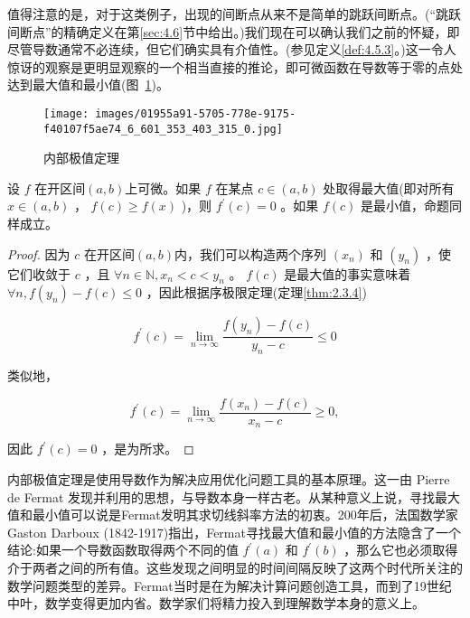 值得注意的是，对于这类例子，出现的间断点从来不是简单的跳跃间断点。(“跳跃间断点”的精确定义在第\ref{sec:4.6}节中给出。)我们现在可以确认我们之前的怀疑，即尽管导数通常不必连续，但它们确实具有介值性。(参见定义\ref{def:4.5.3}。)这一令人惊讶的观察是更明显观察的一个相当直接的推论，即可微函数在导数等于零的点处达到最大值和最小值(图~\ref{fig:5.3})。

\begin{figure}[t]
  \centering
  \texttt{[image: images/01955a91-5705-778e-9175-f40107f5ae74\_6\_601\_353\_403\_315\_0.jpg]}
  \caption{内部极值定理}
  \label{fig:5.3}
\end{figure}


\begin{Thm}
  \label{thm:5.2.6}
  设 \(f\) 在开区间$(a, b)$上可微。如果 \(f\) 在某点 \(c \in  \left( {a,b}\right)\) 处取得最大值(即对所有 \(x \in  \left( {a,b}\right)\) ， \(f\left( c\right)  \geq  f\left( x\right)\) )，则 \({f}^{\prime }\left( c\right)  = 0\) 。如果 \(f\left( c\right)\) 是最小值，命题同样成立。
\end{Thm}

\begin{proof}
  因为 \(c\) 在开区间$(a, b)$内，我们可以构造两个序列 \(\left( {x}_{n}\right)\) 和 \(\left( {y}_{n}\right)\)  ，使它们收敛于 \(c\) ，且 \( \forall n \in  \mathbb{N}, {x}_{n} < c < {y}_{n}\) 。 \(f\left( c\right)\) 是最大值的事实意味着 \(\forall n, f\left( {y}_{n}\right)  - f\left( c\right)  \leq  0\) ，因此根据序极限定理(定理\ref{thm:2.3.4})

\[
{f}^{\prime }\left( c\right)  = \mathop{\lim }\limits_{{n \rightarrow  \infty }}\frac{f\left( {y}_{n}\right)  - f\left( c\right) }{{y}_{n} - c} \leq  0
\]

类似地，

\[
{f}^{\prime }\left( c\right)  = \mathop{\lim }\limits_{{n \rightarrow  \infty }}\frac{f\left( {x}_{n}\right)  - f\left( c\right) }{{x}_{n} - c} \geq  0,
\]

因此 \({f}^{\prime }\left( c\right)  = 0\) ，是为所求。
\end{proof}


内部极值定理是使用导数作为解决应用优化问题工具的基本原理。这一由 Pierre de Fermat 发现并利用的思想，与导数本身一样古老。从某种意义上说，寻找最大值和最小值可以说是Fermat发明其求切线斜率方法的初衷。200年后，法国数学家 Gaston Darboux (1842-1917)指出，Fermat寻找最大值和最小值的方法隐含了一个结论:如果一个导数函数取得两个不同的值 \({f}^{\prime }\left( a\right)\) 和 \({f}^{\prime }\left( b\right)\) ，那么它也必须取得介于两者之间的所有值。这些发现之间明显的时间间隔反映了这两个时代所关注的数学问题类型的差异。Fermat当时是在为解决计算问题创造工具，而到了19世纪中叶，数学变得更加内省。数学家们将精力投入到理解数学本身的意义上。

